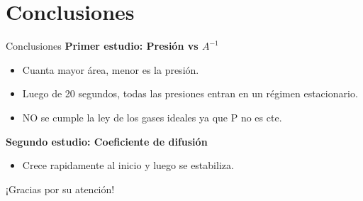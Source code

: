\documentclass{beamer}
\begin{document}
\section{Conclusiones}
\begin{frame}{Conclusiones}
  \textbf{Primer estudio: Presión vs $A^{-1}$}
  \begin{itemize}
    \item Cuanta mayor área, menor es la presión.
    \item Luego de 20 segundos, todas las presiones entran en un régimen estacionario.
    \item NO se cumple la ley de los gases ideales ya que P no es cte.
  \end{itemize}
  \textbf{Segundo estudio: Coeficiente de difusión}
  \begin{itemize}
    \item Crece rapidamente al inicio y luego se estabiliza.
  \end{itemize}
\end{frame}

\begin{frame}{}
  \centering
  \Huge ¡Gracias por su atención!
\end{frame}
\end{document}
